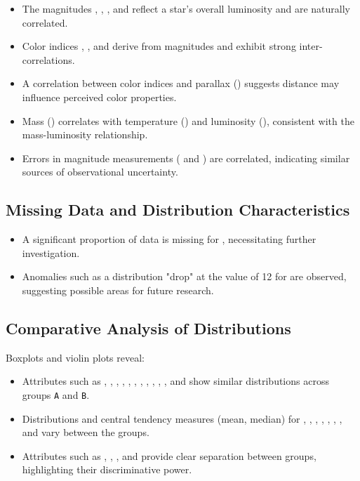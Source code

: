 \begin{itemize}
  \item The magnitudes , , , and  reflect a star's overall luminosity and are naturally correlated.
  \item Color indices , , and  derive from magnitudes and exhibit strong inter-correlations.
  \item A correlation between color indices and parallax () suggests distance may influence perceived color properties.
  \item Mass () correlates with temperature () and luminosity (), consistent with the mass-luminosity relationship.
  \item Errors in magnitude measurements ( and ) are correlated, indicating similar sources of observational uncertainty.
\end{itemize}

\subsection*{Missing Data and Distribution Characteristics}

\begin{itemize}
  \item A significant proportion of data is missing for , necessitating further investigation.
  \item Anomalies such as a distribution "drop" at the value of 12 for  are observed, suggesting possible areas for future research.
\end{itemize}

\subsection*{Comparative Analysis of Distributions}

Boxplots and violin plots reveal:

\begin{itemize}
  \item Attributes such as , , , , , , , , , , , and  show similar distributions across groups \texttt{A} and \texttt{B}.
  \item Distributions and central tendency measures (mean, median) for , , , , , , , and  vary between the groups.
  \item Attributes such as , , , and  provide clear separation between groups, highlighting their discriminative power.
\end{itemize}



